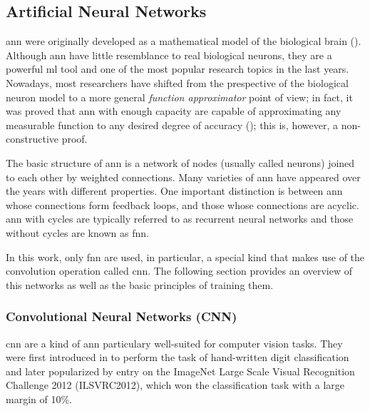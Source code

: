 \documentclass[../main.tex]{subfiles}
\begin{document}
\lipsum[1]

\subsection{Artificial Neural Networks}
\label{sec:artificial-neural-networks}

\gls{ann} were originally developed as a mathematical model of the biological brain
(\cite{McCulloch1943,Rosenblatt58theperceptron,Rumelhart1987}).
Although \gls{ann} have little resemblance to real biological neurons, they are
a powerful \gls{ml} tool and one of the most popular research topics in the last years.
Nowadays, most researchers have shifted from the prespective of the biological
neuron model to a more general \emph{function approximator} point of view;
in fact, it was proved that \gls{ann} with enough capacity are capable of
approximating any measurable function to any desired degree of accuracy
(\cite{Cybenko1989,Hornik1991251}); this is, however, a non-constructive proof.

The basic structure of \gls{ann} is a network of nodes (usually called neurons)
joined to each other by weighted connections.
Many varieties of \gls{ann} have appeared over the years with different properties.
One important distinction is between \gls{ann} whose connections form
feedback loops, and those whose connections are acyclic.
\gls{ann} with cycles are typically referred to as recurrent neural networks
and those without cycles are known as \gls{fnn}.

In this work, only \gls{fnn} are used, in particular, a special kind that makes
use of the convolution operation called \gls{cnn}.
The following section provides an overview of this networks as well as the
basic principles of training them.

\subsubsection{Convolutional Neural Networks (CNN)}
\gls{cnn} are a kind of \gls{ann} particulary well-suited for computer vision
tasks. They were first introduced in \cite{LeCun1998} to perform the task of
hand-written digit classification and later popularized by \cite{Krizhevsky2012}
entry on the ImageNet Large Scale Visual Recognition Challenge 2012
(ILSVRC2012)\footnotemark, which won the classification task with a large
margin of 10\%.
\end{document}
